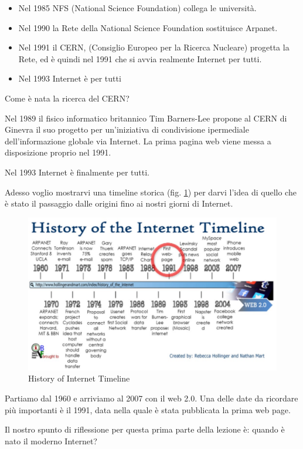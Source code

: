 \begin{itemize}
    \item Nel 1985 NFS (National Science Foundation) collega le università.
    \item Nel 1990 la Rete della National Science Foundation sostituisce Arpanet.
    \item Nel 1991 il CERN, (Consiglio Europeo per la Ricerca Nucleare) progetta la Rete, ed è quindi nel 1991 che si avvia realmente Internet per tutti.
    \item Nel 1993 Internet è per tutti
\end{itemize}

Come è nata la  ricerca del CERN?

Nel 1989 il fisico informatico britannico Tim Barners-Lee propone al CERN di Ginevra il suo progetto per un'iniziativa di condivisione ipermediale dell'informazione globale via Internet. La prima pagina web viene messa a disposizione proprio nel 1991. 

Nel 1993 Internet è finalmente per tutti. 

Adesso voglio mostrarvi una timeline storica (fig. \ref{fig: Internet Timeline}) per darvi l'idea di quello che è stato il passaggio dalle origini fino ai nostri giorni di Internet. 

\begin{figure}[ht]
    \centering
    \includegraphics[width=0.9\linewidth]{images/03_lez_fig_01.jpg}
    \caption{History of Internet Timeline}
    \label{fig: Internet Timeline}
\end{figure}

Partiamo dal 1960 e arriviamo al 2007 con il web 2.0. 
Una delle date da ricordare più importanti è il 1991, data nella quale è stata pubblicata la prima web page.

Il nostro spunto di riflessione per questa prima parte della lezione è: quando è nato il moderno Internet? 

